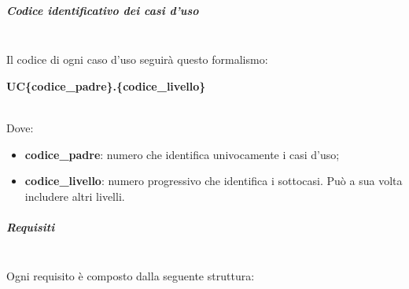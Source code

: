 			\subparagraph{Codice identificativo dei casi d'uso} \mbox{}\\
			Il codice di ogni caso d'uso seguirà questo formalismo: \\
			\centerline{\textbf{UC\{codice\_padre\}.\{codice\_livello\}}} \\
			Dove:
			\begin{itemize}
				\item \textbf{codice\_padre}: numero che identifica univocamente i casi d'uso;
				\item \textbf{codice\_livello}: numero progressivo che identifica i sottocasi. Può a sua volta includere altri livelli.
			\end{itemize}
			\subparagraph{Requisiti} \mbox{}\\
			Ogni requisito è composto dalla seguente struttura:
